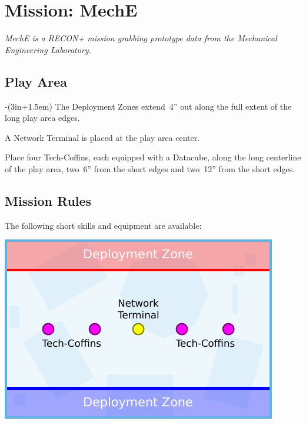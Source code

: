 \chapter{Mission: MechE}

\emph{\emph{MechE} is a RECON+ mission grabbing prototype data from
  the Mechanical Engineering Laboratory.}

\section{Play Area}
\vspace{-2\parskip}
\noindent\begin{stdminipage}{\linewidth-(3in+1.5em)}
\vspace{0pt}   
\noindent
The Deployment Zones extend~4'' out along the full extent of the long
play area edges.

A Network Terminal is placed at the play area center.

Place four Tech-Coffins, each equipped with a Datacube, along the long
centerline of the play area, two~6'' from the short edges and two~12''
from the short edges.

\section{Mission Rules}

The following short skills and equipment are available:

\end{stdminipage}
\hfill
\begin{minipage}[t]{3in}\centering
\vspace{4pt}   
\includegraphics{maps/map-mech}
\end{minipage}

